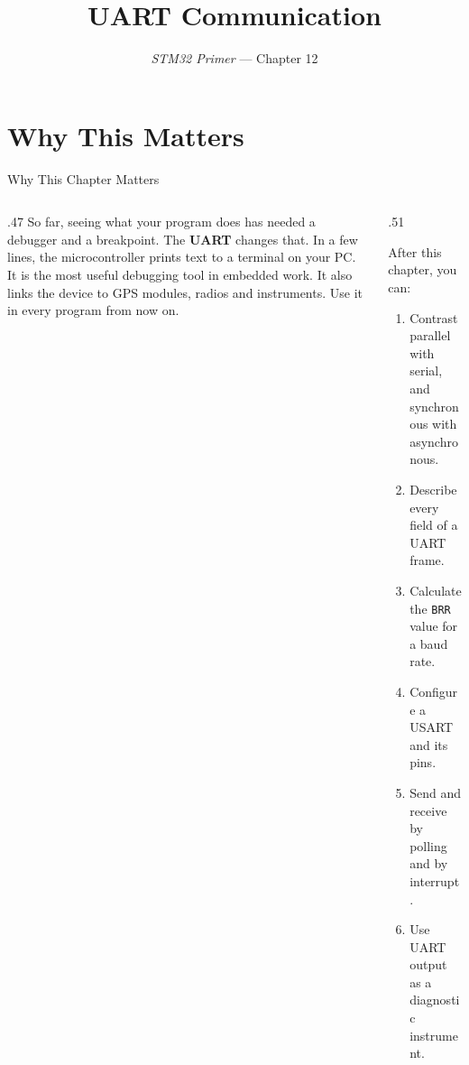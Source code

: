 \documentclass[9pt,aspectratio=169,xcolor=table]{beamer}
\title{UART Communication}
\subtitle{\emph{STM32 Primer} --- Chapter 12}
\begin{document}
\titlepage

\section{Why This Matters}

\begin{frame}{Why This Chapter Matters}
    \begin{columns}[T]
    \begin{column}{.47\textwidth}
        {\normalsize So far, seeing what your program does has needed a debugger and a breakpoint. The \textbf{UART} changes that. In a few lines, the microcontroller prints text to a terminal on your PC. It is the most useful debugging tool in embedded work. It also links the device to GPS modules, radios and instruments. Use it in every program from now on.}
    \end{column}
    \begin{column}{.51\textwidth}
        \begin{block}{After this chapter, you can:}
        {\small
        \begin{enumerate}\itemsep2pt
            \item Contrast parallel with serial, and synchronous with asynchronous.
            \item Describe every field of a UART frame.
            \item Calculate the \texttt{BRR} value for a baud rate.
            \item Configure a USART and its pins.
            \item Send and receive by polling and by interrupt.
            \item Use UART output as a diagnostic instrument.
        \end{enumerate}}
        \end{block}
    \end{column}
    \end{columns}
\end{frame}
\end{document}

